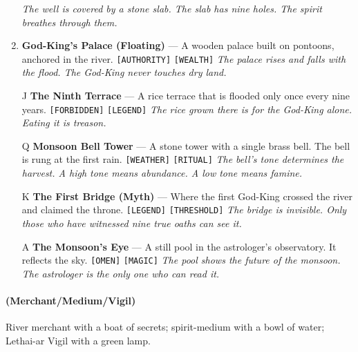 \begin{enumerate}
  \hfill \textit{The well is covered by a stone slab. The slab has nine holes. The spirit breathes through them.}
\item \textbf{God-King's Palace (Floating)} --- A wooden palace built on pontoons, anchored in the river. \texttt{[AUTHORITY]} \texttt{[WEALTH]}
  \hfill \textit{The palace rises and falls with the flood. The God-King never touches dry land.}
\item[J] \textbf{The Ninth Terrace} --- A rice terrace that is flooded only once every nine years. \texttt{[FORBIDDEN]} \texttt{[LEGEND]}
  \hfill \textit{The rice grown there is for the God-King alone. Eating it is treason.}
\item[Q] \textbf{Monsoon Bell Tower} --- A stone tower with a single brass bell. The bell is rung at the first rain. \texttt{[WEATHER]} \texttt{[RITUAL]}
  \hfill \textit{The bell's tone determines the harvest. A high tone means abundance. A low tone means famine.}
\item[K] \textbf{The First Bridge (Myth)} --- Where the first God-King crossed the river and claimed the throne. \texttt{[LEGEND]} \texttt{[THRESHOLD]}
  \hfill \textit{The bridge is invisible. Only those who have witnessed nine true oaths can see it.}
\item[A] \textbf{The Monsoon's Eye} --- A still pool in the astrologer's observatory. It reflects the sky. \texttt{[OMEN]} \texttt{[MAGIC]}
  \hfill \textit{The pool shows the future of the monsoon. The astrologer is the only one who can read it.}
\end{enumerate}

\paragraph*{(Merchant/Medium/Vigil)} River merchant with a boat of secrets; spirit-medium with a bowl of water; Lethai-ar Vigil with a green lamp.


